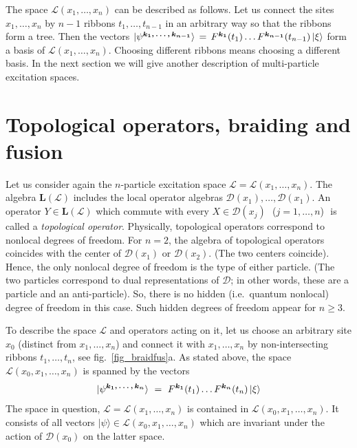 \documentclass[12pt]{article}
\newcommand{\LL}{\mathbf{L}}
\newcommand*{\boldind}[1]{{\mbox{\scriptsize\boldmath$#1$}}}
\newcommand*{\RF}[1]{F^\boldind{#1}}
\newcommand*{\PSI}[1]{|\psi^\boldind{#1}\rangle}
\newcommand{\calD}{\mathcal{D}}
\newcommand{\calL}{\mathcal{L}}
\begin{document}
The space $\calL(x_1,\ldots,x_n)$ can be described as follows. Let us connect
the sites $x_1,\ldots,x_n$ by $n-1$ ribbons $t_1,\ldots,t_{n-1}$ in an
arbitrary way so that the ribbons form a tree.  Then the vectors 
$\PSI{k_1,\ldots,k_{n-1}}\,=\,
 \RF{k_1}(t_1)\ldots\RF{k_{n-1}}(t_{n-1})\,|\xi\rangle$
form a basis of $\calL(x_1,\ldots,x_n)$. Choosing different ribbons means
choosing a different basis. In the next section we will give another
description of multi-particle excitation spaces.


\section{Topological operators, braiding and fusion} \label{sec_topop}

Let us consider again the $n$-particle excitation space 
$\calL=\calL(x_1,\ldots,x_n)$. The algebra $\LL(\calL)$ includes the local
operator algebras $\calD(x_1),\ldots,\calD(x_1)$. An operator $Y\in\LL(\calL)$
which commute with every $X\in\calD(x_j)$\,\, ($j=1,\ldots,n$)\,\, is called a
\emph{topological operator}. Physically, topological operators correspond to
nonlocal degrees of freedom. For $n=2$, the algebra of topological operators
coincides with the center of $\calD(x_1)$ or $\calD(x_2)$. (The two centers
coincide). Hence, the only nonlocal degree of freedom is the type of either
particle. (The two particles correspond to dual representations of $\calD$; in
other words, these are a particle and an anti-particle). So, there is no hidden
(i.e.\ quantum nonlocal) degree of freedom in this case. Such hidden degrees
of freedom appear for $n\ge 3$.

To describe the space $\calL$ and operators acting on it, let us choose an
arbitrary site $x_0$ (distinct from $x_1,\ldots,x_n$) and connect it with
$x_1,\ldots,x_n$ by non-intersecting ribbons $t_1,\ldots,t_n$, see
fig.~\ref{fig_braidfus}a.  As stated above, the space
$\calL(x_0,x_1,\ldots,x_n)$ is spanned by the vectors
\begin{equation} \label{ribbasis}
  \PSI{k_1,\ldots,k_{n}}\ =\ \RF{k_1}(t_1)\ldots\RF{k_{n}}(t_n)\,|\xi\rangle
\end{equation}
The space in question, $\calL=\calL(x_1,\ldots,x_n)$ is contained in
$\calL(x_0,x_1,\ldots,x_n)$. It consists of all vectors
$|\psi\rangle\in\calL(x_0,x_1,\ldots,x_n)$ which are invariant under the
action of $\calD(x_0)$ on the latter space.
\end{document}
